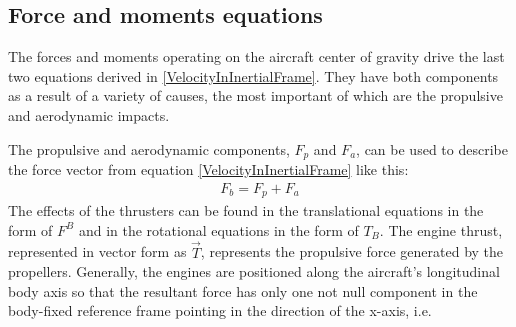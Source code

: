 \documentclass[conference]{IEEEtran}
\begin{document}
\subsection{Force and moments equations}
The forces and moments operating on the aircraft center of gravity drive the
last two equations derived in {\ref{VelocityInInertialFrame}}. They have both
components as a result of a variety of causes, the most important of which are
the propulsive and aerodynamic impacts.
\par
The propulsive and aerodynamic components, $F_p$ and $F_a$, can be used to
describe the force vector from equation {\ref{VelocityInInertialFrame}} like
this:
\begin{align}
    F_b=F_p+F_a
    \label{SumOfAerodynamicAndPropulsionForces}
\end{align}
The effects of the thrusters can be found in the translational equations in the form of $F^B$ and in the rotational equations in the form of $T_B$.
The engine thrust, represented in vector form as $\vec{T}$, represents the propulsive force generated by the propellers.
Generally, the engines are positioned along the aircraft's longitudinal body axis so that the resultant force has only one not null component in the body-fixed reference frame pointing in the direction of the x-axis, i.e.
\end{document}

